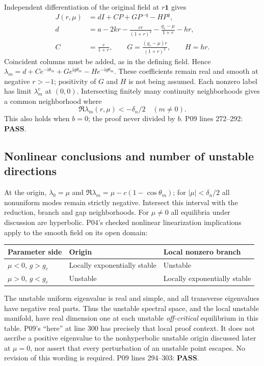 \documentclass[11pt]{article}
\newcommand{\one}{\mathbf{1}}
\newcommand{\lin}[1]{P09 lines #1}
\newcommand{\pass}{\textbf{PASS}}
\newcommand{\ii}{\mathrm i}
\begin{document}
Independent differentiation of the original field at $r\one$ gives
\begin{align*}
 J(r,\mu)&=dI+CP+GP^{-q}-HP^q,\\
 d&=a-2kr-\frac{cr}{(1+r)^2}-\frac{g_c-\mu}{1+r}-hr,\\
 C&=\frac c{1+r},\qquad G=\frac{(g_c-\mu)r}{(1+r)^2},\qquad H=hr.
\end{align*}
Coincident columns must be added, as in the defining field. Hence
$\lambda_m=d+Ce^{-\ii\theta_m}+Ge^{\ii q\theta_m}-He^{-\ii q\theta_m}$.
These coefficients remain real and smooth at negative $r>-1$; positivity
of $G$ and $H$ is not being assumed. Each nonzero label has limit
$\lambda_m^c$ at $(0,0)$. Intersecting finitely many continuity
neighborhoods gives a common neighborhood where
\[
 \Re\lambda_m(r,\mu)<-\delta_n/2\quad(m\ne0).
\]
This also holds when $b=0$; the proof never divided by $b$.
\lin{272--292}: \pass.

\subsection{Nonlinear conclusions and number of unstable directions}
At the origin, $\lambda_0=\mu$ and
$\Re\lambda_m=\mu-c(1-\cos\theta_m)$; for $|\mu|<\delta_n/2$
all nonuniform modes remain strictly negative. Intersect this interval
with the reduction, branch and gap neighborhoods. For $\mu\ne0$ all
equilibria under discussion are hyperbolic. P04's checked nonlinear
linearization implications apply to the smooth field on its open domain:
\begin{center}
\begin{tabular}{lll}
\toprule
Parameter side & Origin & Local nonzero branch\\\midrule
$\mu<0$, $g>g_c$ & Locally exponentially stable & Unstable\\
$\mu>0$, $g<g_c$ & Unstable & Locally exponentially stable\\
\bottomrule
\end{tabular}
\end{center}
The unstable uniform eigenvalue is real and simple, and all transverse
eigenvalues have negative real parts. Thus the unstable spectral space,
and the local unstable manifold, have real dimension one at each unstable
\emph{off-critical} equilibrium in this table. P09's ``here'' at line 300
has precisely that local proof context. It does not ascribe a positive
eigenvalue to the nonhyperbolic unstable origin discussed later at
$\mu=0$, nor assert that every perturbation of an unstable point escapes.
No revision of this wording is required. \lin{294--303}: \pass.
\end{document}
